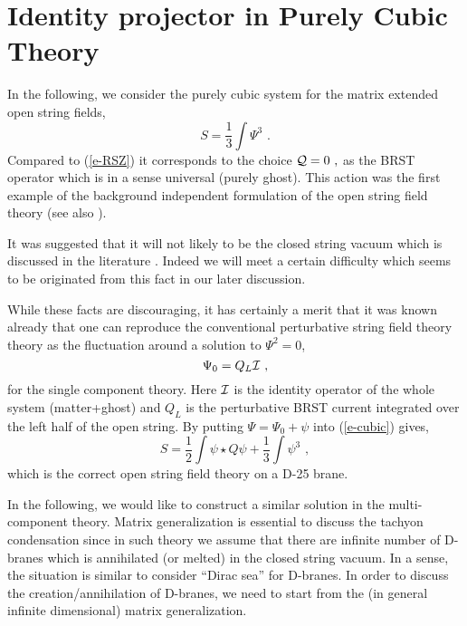 \documentclass[a4paper,12pt]{article}
\begin{document}
\section{Identity projector in Purely Cubic Theory}

In the following, we consider the purely cubic system 
for the matrix extended open string fields,
\begin{equation}\label{e-cubic}
 S=\frac{1}{3}\int \Psi^3\,\,.
\end{equation}
Compared to (\ref{e-RSZ})
it corresponds to the choice 
$
 {\cal Q}=0\,\,,
$
as the BRST operator which is 
in a sense universal (purely ghost).
This action was the first example of the background
independent formulation of the open string field theory
\cite{r-FWY,r-HLRS} 
(see also \cite{r-HIKKO, r-HMMW, r-Romans, r-Kluson}).

It was suggested \cite{r-RSZ1} that it will not likely
to be the closed string
vacuum which is discussed in the literature
\cite{r-Vacuum, r-Ohmori}.  Indeed we will meet a certain
difficulty which seems to be originated from 
this fact in our later discussion.

While these facts are discouraging,
it has certainly  a  merit that it was known already
\cite{r-HLRS,r-Romans} that one can 
reproduce the conventional perturbative string field theory
theory  as the fluctuation around a
solution to $\Psi^2=0$,
\begin{equation}\label{e-vacuum}
 \Psi_0= Q_L {\cal I}\,\,,
\end{equation}
for the single component theory.
Here ${\cal I}$ is the identity operator of the whole system
(matter+ghost) and $Q_L$ is the perturbative BRST current
integrated over the left half of the open string.
By putting $\Psi=\Psi_0+\psi$ into 
(\ref{e-cubic}) gives,
\begin{equation}
 S=\frac{1}{2} \int \psi \star Q \psi +\frac{1}{3} \int \psi^3\,\,,
\end{equation}
which is the correct open string field theory on a D-25 brane.

In the following, we would like to construct 
a similar solution in the multi-component theory.
Matrix generalization is essential to discuss
the tachyon condensation since in such theory we assume
that there are infinite number of D-branes which is annihilated
(or melted) in the closed string vacuum.  In a sense, the situation
is similar to consider ``Dirac sea'' for D-branes.
In order to discuss
the creation/annihilation of D-branes, we need to start from
the (in general infinite dimensional) matrix generalization.
\end{document}
